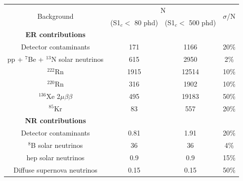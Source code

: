 \begin{table}[]
    \centering
    \begin{tabular}{c|c|c|c}
        \multirow{2}{*}{Background}                  & \multicolumn{2}{|c|}{N}                          & \multirow{2}{*}{$\sigma$/N}  \\ 
                                                     &  (S1$_c <$ 80 phd)     & (S1$_c <$ 500 phd)      &              \\ \hline
        \textbf{ER contributions}                    &                        &                         &   \\
        Detector contaminants                        & 171                    & 1166                    & 20\% \cite{LZ_projected_sensitivity_paper_ref}        \\
        pp + ${}^{7}$Be + ${}^{13}$N solar neutrinos & 615                    & 2950                    & 2\% \cite{pp_solar_neutrinos_rate_ref}       \\
        ${}^{222}$Rn                                 & 1915                   & 12514                   & 10\% \cite{lz_predicted_radon_rate_ref}        \\
        ${}^{220}$Rn                                 & 316                    & 1902                    & 10\% \cite{lz_predicted_radon_rate_ref}        \\
        ${}^{136}$Xe 2$\mu\beta\beta$                & 495                    & 19183                   & 50\% \cite{double_beta_decay_rate_ref}        \\
        ${}^{85}$Kr                                  & 83                     & 557                     & 20\% \cite{kr85_rate_ref}         \\ \hline
        \textbf{NR contributions}                    &                        &                         &   \\
        Detector contaminants                        & 0.81                   & 1.91                    & 20\% \cite{LZ_projected_sensitivity_paper_ref}         \\
        ${}^{8}$B solar neutrinos                    & 36                     & 36                      & 4\%  \cite{b8_neutrino_rate_ref}       \\
        hep solar neutrinos                          & 0.9                    & 0.9                     & 15\% \cite{solar_neutrinos_rate_ref, pp_solar_neutrinos_rate_ref}        \\
        Diffuse supernova neutrinos                  & 0.15                   & 0.15                    & 50\% \cite{dissuse_supernova_neutrinos_rate_ref}        \\

\end{tabular}
\end{table}
